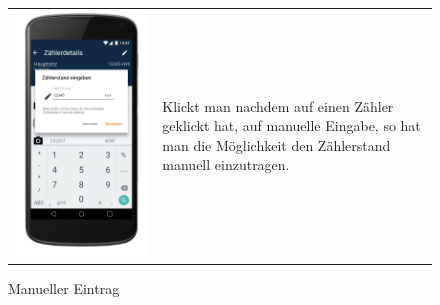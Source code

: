 \begin{figure}[h]
\begin{tabularx}{\textwidth}{X  X}
	\includegraphics[scale = 0.155]{img/AndroidMockup/manuelEntry} \caption{Manueller Eintrag}&  Klickt man nachdem auf einen Zähler geklickt hat, auf manuelle Eingabe, so hat man die Möglichkeit den Zählerstand manuell einzutragen.  \\

\end{tabularx}
\end{figure}
